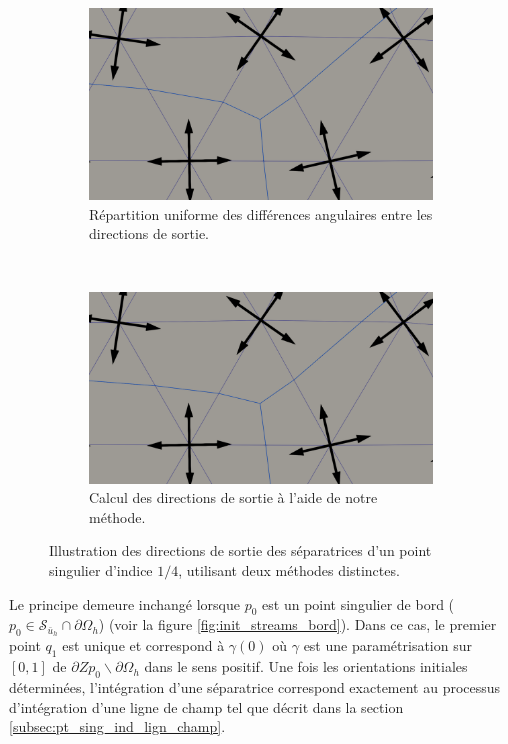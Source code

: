 \begin{figure}[htpb]
\centering
\begin{subfigure}[b]{0.7\textwidth}
    \centering
    \includegraphics[width=\textwidth]{images/depart_sepa_1.pdf}
    \caption{Répartition uniforme des différences angulaires entre les directions de sortie.}
\end{subfigure}
\\[0.5cm]
\begin{subfigure}[b]{0.7\textwidth}
    \centering
    \includegraphics[width=\textwidth]{images/depart_sepa_2.pdf}
    \caption{Calcul des directions de sortie à l'aide de notre méthode.}
\end{subfigure}
\caption{Illustration des directions de sortie des séparatrices d'un point singulier d'indice $1/4$, utilisant deux méthodes distinctes.}
\label{fig:first_dir}
\end{figure}


Le principe demeure inchangé lorsque $p_0$ est un point singulier de bord ($p_0\in\mathcal{S}_{\bar{u}_h}\cap\partial\Omega_h$) (voir la figure \ref{fig:init_streams_bord}). Dans ce cas, le premier point $q_1$ est unique et correspond à $\gamma(0)$ où $\gamma$ est une paramétrisation sur $[0, 1]$ de $\partial Z{p_0}\backslash\partial\Omega_h$ dans le sens positif. Une fois les orientations initiales déterminées, l'intégration d'une séparatrice correspond exactement au processus d'intégration d'une ligne de champ tel que décrit dans la section \ref{subsec:pt_sing_ind_lign_champ}.

